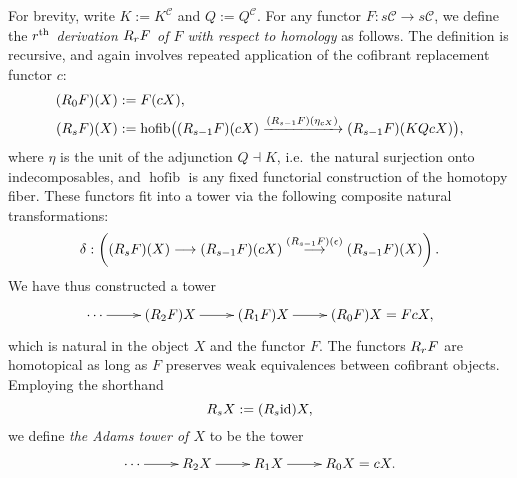 \documentclass[11pt]{amsart} \renewcommand{\baselinestretch}{1.2}
\theoremstyle{plain}
\numberwithin{equation}{section} %
\theoremstyle{plain}
\numberwithin{equation}{chapter} %
\DeclareMathOperator*{\hofib}{hofib}
\renewcommand{\to}{\longrightarrow}
\newcommand{\calc}{\mathcal{C}}
\newcommand{\Id}{\mathrm{id}}
\newcommand{\algcat}{{\calc}}%
\newcommand{\dupdown}[2]{R_{\smash{#1}}}
\begin{document}
\begin{Bousfield-Kan spectral sequence}
For brevity, write $K:= K^{\calc}$ and $Q:=Q^{\calc}$. For any functor $F:s\algcat\to s\algcat$, we define the \emph{$r^\textup{th}$ derivation $\dupdown{r}{c}F$ of $F$ with respect to  homology} as follows. The definition is recursive, and again involves repeated application of the cofibrant replacement functor $c$: 
\begin{alignat*}{2}
(\dupdown{0}{c}F)(X)
&:=
F(cX),%
\\
(\dupdown{s}{c}F)(X)
&:=
\hofib\bigl((\dupdown{s-1}{c}F)(cX)\xrightarrow{(\dupdown{s-1}{c}F)(\eta_{cX})} (\dupdown{s-1}{c}F)(KQcX)\bigr),
\end{alignat*}
where $\eta$ is the unit of the adjunction $Q\dashv K$, i.e.\ the natural surjection onto indecomposables, and $\hofib$ is any fixed  functorial construction of the homotopy fiber. These functors fit into a tower via the following composite natural transformations:
\[\delta:\left((\dupdown{s}{c}F)(X)\to (\dupdown{s-1}{c}F)(cX)\overset{(\dupdown{s-1}{c}F)(\epsilon)}{\to} (\dupdown{s-1}{c}F)(X)\right).\]
We have thus constructed a tower
\[\xymatrix@R=4mm{
\cdots 
\ar[r]
&%
(\dupdown{2}{c}F)X
\ar[r]
&%
(\dupdown{1}{c}F)X
\ar[r]&%
(\dupdown{0}{c}F)X=FcX,
}\]%
which is natural in the object $X$ and the functor $F$.
The functors $\dupdown{r}{c}F$ are homotopical as long as $F$ preserves weak equivalences between cofibrant objects. Employing the shorthand
\[\dupdown{s}{c}X:=(\dupdown{s}{c}\Id )X,\]
we define \emph{the Adams tower of $X$} to be the tower
\[\xymatrix@R=4mm{
\cdots 
\ar[r]
&%
\dupdown{2}{c}X
\ar[r]
&%
\dupdown{1}{c}X
\ar[r]&%
\dupdown{0}{c}X=cX.
}\]


\end{Bousfield-Kan spectral sequence}
\end{document}

